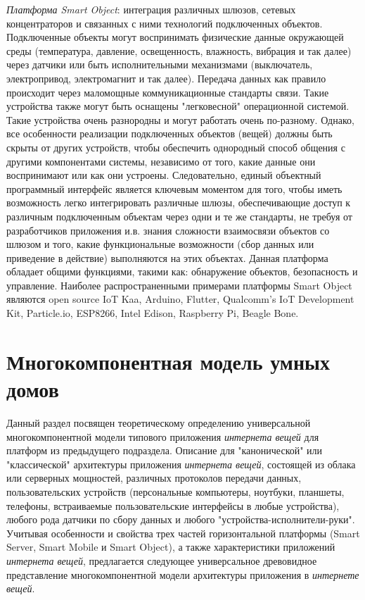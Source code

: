 \begin{textitemize}
	\item \textit{Платформа Smart Object}: интеграция различных шлюзов, сетевых концентраторов и связанных с ними технологий подключенных объектов. Подключенные объекты могут воспринимать физические данные окружающей среды (температура, давление, освещенность, влажность, вибрация и так далее) через датчики или быть исполнительными механизмами (выключатель, электропривод, электромагнит и так далее). Передача данных как правило происходит через маломощные коммуникационные стандарты связи. Такие устройства также могут быть оснащены "легковесной"{} операционной системой. Такие устройства очень разнородны и могут работать очень по-разному. Однако, все особенности реализации подключенных объектов (вещей) должны быть скрыты от других устройств, чтобы обеспечить однородный способ общения с другими компонентами системы, независимо от того, какие данные они воспринимают или как они устроены. Следовательно, единый объектный программный интерфейс является ключевым моментом для того, чтобы иметь возможность легко интегрировать различные шлюзы, обеспечивающие доступ к различным подключенным объектам через одни и те же стандарты, не требуя от разработчиков приложения и.в. знания сложности взаимосвязи объектов со шлюзом и того, какие функциональные возможности (сбор данных или приведение в действие) выполняются на этих объектах. Данная платформа обладает общими функциями, такими как: обнаружение объектов, безопасность и управление. Наиболее распространенными примерами платформы Smart Object являются open source IoT Kaa, Arduino, Flutter, Qualcomm’s IoT Development Kit, Particle.io, ESP8266, Intel Edison, Raspberry Pi, Beagle Bone.
\end{textitemize}


\section{Многокомпонентная модель умных домов}
\label{sec_multicomponent_SH_model}

Данный раздел посвящен теоретическому определению универсальной многокомпонентной модели типового приложения \textit{интернета вещей} для платформ из предыдущего подраздела. Описание для "канонической"{} или "классической"{} архитектуры приложения \textit{интернета вещей}, состоящей из облака или серверных мощностей, различных протоколов передачи данных, пользовательских устройств (персональные компьютеры, ноутбуки, планшеты, телефоны, встраиваемые пользовательские интерфейсы в любые устройства), любого рода датчики по сбору данных и любого "устройства-исполнители-руки"{}. Учитывая особенности и свойства трех частей горизонтальной платформы (Smart Server, Smart Mobile и Smart Object), а также характеристики приложений \textit{интернета вещей}, предлагается следующее универсальное древовидное представление многокомпонентной модели архитектуры приложения в \textit{интернете вещей}.

